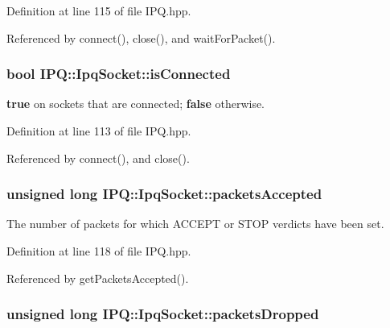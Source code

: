 \-Definition at line 115 of file \-I\-P\-Q.\-hpp.



\-Referenced by connect(), close(), and wait\-For\-Packet().

\hypertarget{classIPQ_1_1IpqSocket_a5f17c2492bd9205c4120e8dbeec652d2}{
\subsubsection[{is\-Connected}]{\setlength{\rightskip}{0pt plus 5cm}bool {\bf \-I\-P\-Q\-::\-Ipq\-Socket\-::is\-Connected}}}
\label{classIPQ_1_1IpqSocket_a5f17c2492bd9205c4120e8dbeec652d2}


{\bfseries true} on sockets that are connected; {\bfseries false} otherwise. 



\-Definition at line 113 of file \-I\-P\-Q.\-hpp.



\-Referenced by connect(), and close().

\hypertarget{classIPQ_1_1IpqSocket_a50304942c2b695fecdb496d6d424937a}{
\subsubsection[{packets\-Accepted}]{\setlength{\rightskip}{0pt plus 5cm}unsigned long {\bf \-I\-P\-Q\-::\-Ipq\-Socket\-::packets\-Accepted}}}
\label{classIPQ_1_1IpqSocket_a50304942c2b695fecdb496d6d424937a}


\-The number of packets for which \-A\-C\-C\-E\-P\-T or \-S\-T\-O\-P verdicts have been set. 



\-Definition at line 118 of file \-I\-P\-Q.\-hpp.



\-Referenced by get\-Packets\-Accepted().

\hypertarget{classIPQ_1_1IpqSocket_acc24abac49471076d9555f58afb0d162}{
\subsubsection[{packets\-Dropped}]{\setlength{\rightskip}{0pt plus 5cm}unsigned long {\bf \-I\-P\-Q\-::\-Ipq\-Socket\-::packets\-Dropped}}}
\label{classIPQ_1_1IpqSocket_acc24abac49471076d9555f58afb0d162}


